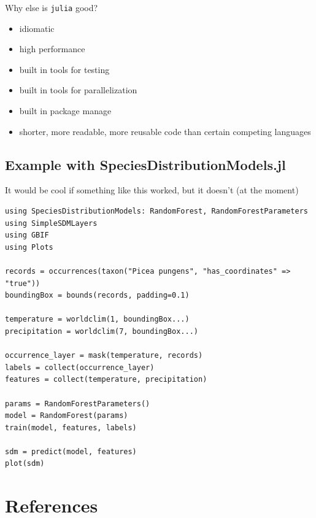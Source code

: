 \documentclass[11pt]{article}
\begin{document}
Why else is \texttt{julia} good?

\begin{itemize}
\tightlist
\item
  idiomatic
\item
  high performance
\item
  built in tools for testing
\item
  built in tools for parallelization
\item
  built in package manage
\item
  shorter, more readable, more reusable code than certain competing
  languages
\end{itemize}

\hypertarget{example-with-speciesdistributionmodels.jl}{%
\subsection{Example with
SpeciesDistributionModels.jl}\label{example-with-speciesdistributionmodels.jl}}

It would be cool if something like this worked, but it doesn't (at the
moment)

\begin{verbatim}
using SpeciesDistributionModels: RandomForest, RandomForestParameters
using SimpleSDMLayers
using GBIF
using Plots

records = occurrences(taxon("Picea pungens", "has_coordinates" => "true"))    
boundingBox = bounds(records, padding=0.1)

temperature = worldclim(1, boundingBox...)
precipitation = worldclim(7, boundingBox...)

occurrence_layer = mask(temperature, records)
labels = collect(occurrence_layer)
features = collect(temperature, precipitation)

params = RandomForestParameters()
model = RandomForest(params)
train(model, features, labels)

sdm = predict(model, features)
plot(sdm)
\end{verbatim}

\hypertarget{references}{%
\section*{References}\label{references}}
\end{document}
